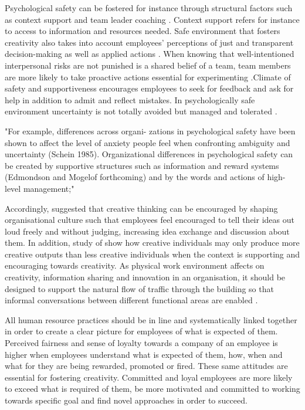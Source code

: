 Psychological safety can be fostered for instance through structural factors such as context support and team leader coaching \citep{hackman1987design,edmondson1999psychological}. Context support refers for instance to access to information and resources needed. Safe environment that fosters creativity also takes into account employees' perceptions of just and transparent decision-making as well as applied actions \citep{shalley2004leaders}. When knowing that well-intentioned interpersonal risks are not punished is a shared belief of a team, team members are more likely to take proactive actions essential for experimenting \citep{garvin2008yours}.Climate of safety and supportiveness encourages employees to seek for feedback and ask for help in addition to admit and reflect mistakes. \citep{edmondson1999psychological} In psychologically safe environment uncertainty is not totally avoided but managed and tolerated \citep{shalley2004leaders}. 

"For example, differences across organi- zations in psychological safety have been shown to affect the level of anxiety people feel when confronting ambiguity and uncertainty (Schein 1985). Organizational differences in psychological safety can be created by supportive structures such as information and reward systems (Edmondson and Mogelof forthcoming) and by the words and actions of high-level management;"

Accordingly, \citet{amabile1998kill} suggested that creative thinking can be encouraged by shaping organisational culture such that employees feel encouraged to tell their ideas out loud freely and without judging, increasing idea exchange and discussion about them. In addition, study of \citet{oldham1996employee} show how creative individuals may only produce more creative outputs than less creative individuals when the context is supporting and encouraging towards creativity.  As physical work environment affects on creativity, information sharing and innovation in an organisation, it should be designed to support the natural flow of traffic through the building so that informal conversations between different functional areas are enabled \citep{shalley2004leaders}. 

All human resource practices should be in line and systematically linked together in order to create a clear picture for employees of what is expected of them. Perceived fairness and sense of loyalty towards a company of an employee is higher when employees understand what is expected of them, how, when and what for they are being rewarded, promoted or fired. These same attitudes are essential for fostering creativity. Committed and loyal employees are more likely to exceed what is required of them, be more motivated and committed to working towards specific goal and find novel approaches in order to succeed. \citep{shalley2004leaders} 

